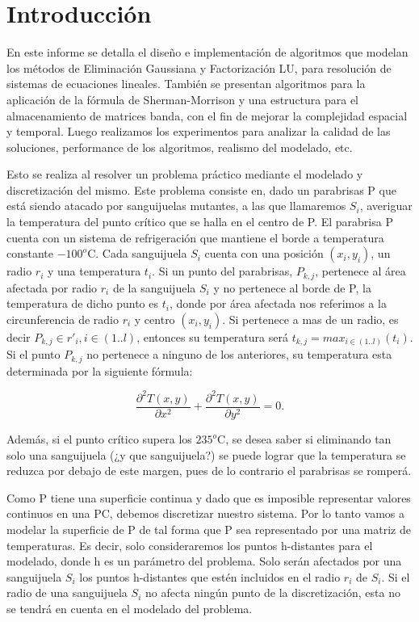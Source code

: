 \section{Introducción}

En este informe se detalla el diseño e implementación de algoritmos que modelan los métodos de Eliminación Gaussiana y Factorización LU,
para resolución de sistemas de ecuaciones lineales. También se presentan algoritmos para la aplicación de la fórmula de Sherman-Morrison y
una estructura para el almacenamiento de matrices banda, con el fin de mejorar la complejidad espacial y temporal. Luego realizamos los experimentos para analizar la calidad de las soluciones, performance de los algoritmos, realismo del modelado, etc.

Esto se realiza al resolver un problema práctico mediante el modelado y discretización del mismo. Este problema consiste en, dado un parabrisas 
P que está siendo atacado por sanguijuelas mutantes, a las que llamaremos $S_i$, averiguar la temperatura del punto crítico que se
halla en el centro de P. El parabrisa P cuenta con un sistema de refrigeración que mantiene el borde a temperatura constante
$-100^o$C. Cada sanguijuela $S_i$ cuenta con una posición $(x_i, y_i)$, un radio $r_i$ y una temperatura $t_i$. Si un punto del
parabrisas, $P_{k,j}$, 
pertenece al área afectada por radio $r_i$ de la sanguijuela $S_i$ y no pertenece al borde de P, la temperatura de dicho punto es $t_i$, donde por área afectada nos referimos a la circunferencia de 
radio $r_i $ y centro $(x_i, y_i)$. Si pertenece a mas de un radio, es decir
$P_{k,j} \in {r'_i}, i\in (1..l) $, entonces su temperatura será 
$t_{k,j}=max_{i\in (1..l)}(t_i) $. Si el punto $P_{k,j}$ no pertenece a ninguno de los anteriores,
su temperatura esta determinada por la siguiente fórmula:


\begin{equation}\label{eq:calor}
\frac{\partial^2T(x,y)}{\partial x^{2}}+\frac{\partial^2 T(x,y)}{\partial y^{2}} = 0.
\end{equation}

Además, si el punto crítico supera los $235^o $C, se desea saber si eliminando tan solo una sanguijuela (¿y que sanguijuela?)
se puede lograr que la 
temperatura se reduzca por debajo de este margen, pues de lo contrario el parabrisas se romperá.

Como P tiene una superficie continua y dado que es imposible representar valores continuos en una PC,
debemos discretizar nuestro sistema. Por lo tanto vamos a modelar la superficie de P de tal forma que P sea representado por una matriz de
temperaturas. Es decir, solo consideraremos los puntos h-distantes para el modelado, donde h es un parámetro del problema. 
Solo serán afectados por una sanguijuela $S_i$ los puntos h-distantes que estén incluidos en el radio $r_i$ de $S_i$. Si el radio de una sanguijuela $S_i$ no 
afecta ningún punto de la discretización, esta no se tendrá en cuenta en el modelado del problema. 

